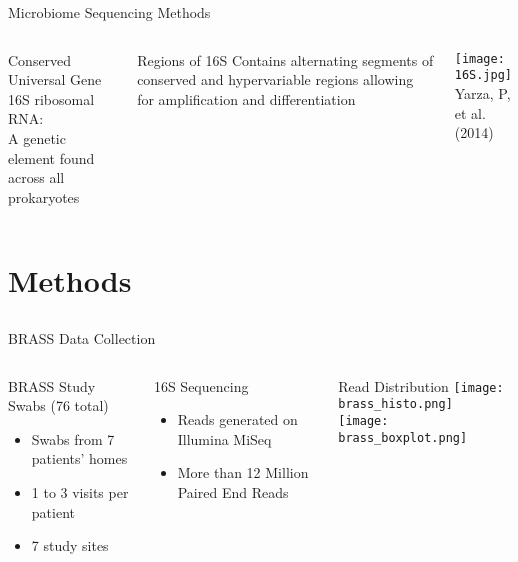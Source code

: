 \documentclass[11pt]{beamer}
\begin{document}
	\begin{frame}{Microbiome Sequencing Methods}
	\begin{columns}
	\begin{block}{Conserved Universal Gene}
	16S ribosomal RNA: \\
	A genetic element found across all prokaryotes 
	\end{block}
	
	\begin{block}{Regions of 16S}
	Contains alternating segments of conserved and hypervariable regions allowing for amplification and differentiation
	\end{block}
	
	\texttt{[image: 16S.jpg]} \\
	\hspace{0.5cm}	
	\tiny{Yarza, P, et al. (2014)}
	\end{columns}

	
	\end{frame}

	
\section{Methods}
\subsection{}


	\begin{frame}{BRASS Data Collection}
	\begin{columns}
	\column{0.5\textwidth}
	\begin{block}{BRASS Study Swabs (76 total)}
		\begin{itemize}
			\item Swabs from 7 patients' homes
			\item 1 to 3 visits per patient
			\item 7 study sites
		\end{itemize}
	\end{block}
	\begin{block}{16S Sequencing}
	\begin{itemize}
		\item Reads generated on Illumina MiSeq
		\item More than 12 Million Paired End Reads
	\end{itemize}
	\end{block}
	
	
	\column{0.5\textwidth}
	\begin{block}{Read Distribution}
	\texttt{[image: brass\_histo.png]}\\
	\texttt{[image: brass\_boxplot.png]}
	\end{block}
	\end{columns}
	\end{frame}
\end{document}
